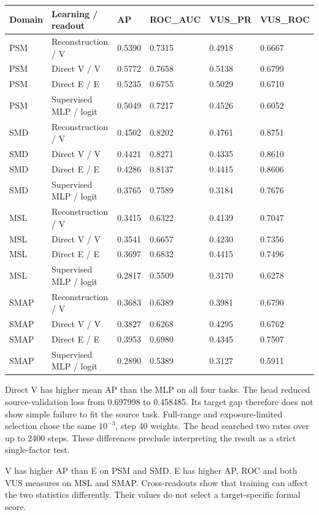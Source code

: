 \documentclass[
  english,
  10pt,
]{article}
\begin{document}
\begin{longtable}[]{@{}llllll@{}}
\toprule\noalign{}
Domain & Learning / readout & AP & ROC\_AUC & VUS\_PR & VUS\_ROC \\
\midrule\noalign{}
\endhead
\bottomrule\noalign{}
\endlastfoot
PSM & Reconstruction / V & 0.5390 & 0.7315 & 0.4918 & 0.6667 \\
PSM & Direct V / V & 0.5772 & 0.7658 & 0.5138 & 0.6799 \\
PSM & Direct E / E & 0.5235 & 0.6755 & 0.5029 & 0.6710 \\
PSM & Supervised MLP / logit & 0.5049 & 0.7217 & 0.4526 & 0.6052 \\
SMD & Reconstruction / V & 0.4502 & 0.8202 & 0.4761 & 0.8751 \\
SMD & Direct V / V & 0.4421 & 0.8271 & 0.4335 & 0.8610 \\
SMD & Direct E / E & 0.4286 & 0.8137 & 0.4415 & 0.8606 \\
SMD & Supervised MLP / logit & 0.3765 & 0.7589 & 0.3184 & 0.7676 \\
MSL & Reconstruction / V & 0.3415 & 0.6322 & 0.4139 & 0.7047 \\
MSL & Direct V / V & 0.3541 & 0.6657 & 0.4230 & 0.7356 \\
MSL & Direct E / E & 0.3697 & 0.6832 & 0.4415 & 0.7496 \\
MSL & Supervised MLP / logit & 0.2817 & 0.5509 & 0.3170 & 0.6278 \\
SMAP & Reconstruction / V & 0.3683 & 0.6389 & 0.3981 & 0.6790 \\
SMAP & Direct V / V & 0.3827 & 0.6268 & 0.4295 & 0.6762 \\
SMAP & Direct E / E & 0.3953 & 0.6980 & 0.4345 & 0.7507 \\
SMAP & Supervised MLP / logit & 0.2890 & 0.5389 & 0.3127 & 0.5911 \\
\end{longtable}

Direct V has higher mean AP than the MLP on all four tasks. The head
reduced source-validation loss from 0.697998 to 0.458485. Its target gap
therefore does not show simple failure to fit the source task.
Full-range and exposure-limited selection chose the same \(10^{-3}\),
step 40 weights. The head searched two rates over up to 2400 steps.
These differences preclude interpreting the result as a strict
single-factor test.

V has higher AP than E on PSM and SMD. E has higher AP, ROC and both VUS
measures on MSL and SMAP. Cross-readouts show that training can affect
the two statistics differently. Their values do not select a
target-specific formal score.
\end{document}

